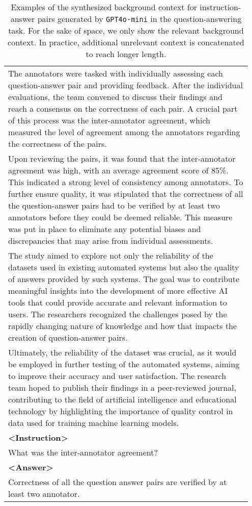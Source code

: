 \begin{table*}[]
{\begin{tabular}{p{0.95\linewidth}}
    The annotators were tasked with individually assessing each question-answer pair and providing feedback. After the individual evaluations, the team convened to discuss their findings and reach a consensus on the correctness of each pair. A crucial part of this process was the inter-annotator agreement, which measured the level of agreement among the annotators regarding the correctness of the pairs. \\
    Upon reviewing the pairs, it was found that the inter-annotator agreement was high, with an average agreement score of 85\%. This indicated a strong level of consistency among annotators. To further ensure quality, it was stipulated that the correctness of all the question-answer pairs had to be verified by at least two annotators before they could be deemed reliable. This measure was put in place to eliminate any potential biases and discrepancies that may arise from individual assessments. \\
    The study aimed to explore not only the reliability of the datasets used in existing automated systems but also the quality of answers provided by such systems. The goal was to contribute meaningful insights into the development of more effective AI tools that could provide accurate and relevant information to users. The researchers recognized the challenges posed by the rapidly changing nature of knowledge and how that impacts the creation of question-answer pairs. \\
    Ultimately, the reliability of the dataset was crucial, as it would be employed in further testing of the automated systems, aiming to improve their accuracy and user satisfaction. The research team hoped to publish their findings in a peer-reviewed journal, contributing to the field of artificial intelligence and educational technology by highlighting the importance of quality control in data used for training machine learning models. \\
    \textbf{<Instruction>} \\
    What was the inter-annotator agreement? \\
    \textbf{<Answer>} \\
    Correctness of all the question answer pairs are verified by at least two annotator. \\
    \bottomrule
    \end{tabular}
    }
    \caption{Examples of the synthesized background context for instruction-answer pairs generated by \texttt{GPT4o-mini} in the question-answering task. For the sake of space, we only show the relevant background context. In practice, additional unrelevant context is concatenated to reach longer length.}
    \label{tab:synthesis-context-qa-case}
\end{table*}
\endgroup

